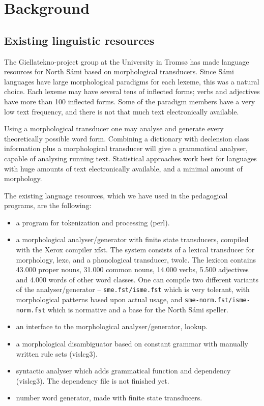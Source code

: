 \documentclass[a4paper,12pt]{article}
\begin{document}
\section{Background}


\subsection{Existing linguistic resources}

The Giellatekno-project group at the University in Tromsø has made language resources for North Sámi based on morphological transducers. Since Sámi languages have large morphological paradigms for each lexeme, this was a natural choice. Each lexeme may have several tens of inflected forms; verbs and adjectives have more than 100 inflected forms. Some of the paradigm members have a very low text frequency, and there is not that much text electronically available. \citep{TT07}  

Using a morphological transducer one may analyse and generate every theoretically possible word form. Combining a dictionary with declension class information plus a morphological transducer will give a grammatical analyser, capable of analysing running text. Statistical approaches work best for languages with huge amounts of text electronically available, and a minimal amount of morphology. 
\citep{TT07}

The existing language resources, which we have used in the pedagogical programs, are the following:
\begin{itemize}
\item a program for tokenization and processing (perl).
\item a morphological analyser/generator with finite state transducers, compiled with the Xerox compiler xfst. The system consists of a lexical transducer for morphology, lexc, and a phonological transducer, twolc. The lexicon contains 43.000 proper nouns, 31.000 common nouns, 14.000 verbs, 5.500 adjectives and 4.000 words of other word classes. One can compile two different variants of the analyser/generator -- \texttt{sme.fst/isme.fst} which is very tolerant, with morphological patterns based upon actual usage, and \texttt{sme-norm.fst/isme-norm.fst} which is normative and a base for the North Sámi speller.  
\item an interface to the morphological analyser/generator, lookup. 
\item a morphological disambiguator based on constant grammar with manually written rule sets (vislcg3). 
\item syntactic analyser which adds grammatical function and dependency (vislcg3). The dependency file is not finished yet.
\item number word generator, made with finite state transducers.
\end{itemize}
\end{document}
